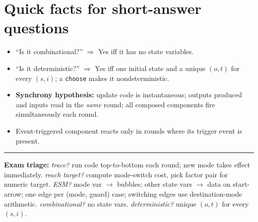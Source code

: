 \section{Quick facts for short-answer questions}

\begin{itemize}
  \item ``Is it combinational?'' $\Rightarrow$ Yes iff it has no state variables.
  \item ``Is it deterministic?'' $\Rightarrow$ Yes iff one initial state and a unique
        $(o,t)$ for every $(s,i)$; a \texttt{choose} makes it nondeterministic.
  \item \textbf{Synchrony hypothesis:} update code is instantaneous; outputs produced
        and inputs read in the \emph{same} round; all composed components fire
        simultaneously each round.
  \item Event-triggered component reacts only in rounds where its trigger event is present.
\end{itemize}

\vspace{4pt}
\hrule
\vspace{2pt}
{\footnotesize\textbf{Exam triage:} \emph{trace?} run code top-to-bottom each round; new mode takes effect immediately. \emph{reach target?} compute mode-switch cost, pick factor pair for numeric target. \emph{ESM?} mode var $\to$ bubbles; other state vars $\to$ data on start-arrow; one edge per (mode, guard) case; switching edges use destination-mode arithmetic. \emph{combinational?} no state vars. \emph{deterministic?} unique $(o,t)$ for every $(s,i)$.}
